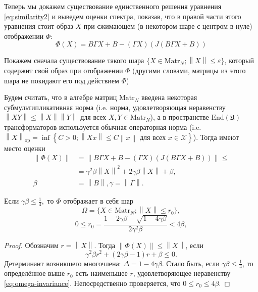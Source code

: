 Теперь мы докажем существование единственного решения уравнения \eqref{eq:similarity2}
и выведем оценки спектра,
показав, что в правой части этого уравнения стоит образ \( X \)
при сжимающем (в некотором шаре с центром в нуле) отображении \( \Phi \):
\[ \Phi(X) = B \Gamma X + B - (\Gamma X) (J(B\Gamma X + B)) \]

Покажем сначала существование такого шара \( \{ X\in\mathrm{Matr}_{N}; {\left\|X\right\|} \leq \varepsilon \} \),
который содержит свой образ при отображении \( \Phi \)
(другими словами, матрицы из этого шара
 не покидают его под действием \( \Phi \))

Будем считать, что в алгебре матриц \( \mathrm{Matr}_{N} \)
введена некоторая субмультипликативная норма
(i.e. норма, удовлетворяющая неравенству
 \( {\left\|XY\right\|}\leq {\left\|X\right\|}{\left\|Y\right\|} \) для всех \( X, Y \in\mathrm{Matr}_N\)),
а в пространстве \( \mathrm{End}\left({\mathfrak U}\right) \) трансформаторов
используется обычная операторная норма
(i.e. \( \left\|X\right\|_\mathrm{op} =
          \inf
          \left\{ C>0;
          {\left\|X x\right\|} \leq C {\left\|x\right\|} \text{ для всех } x\in\mathscr{X}
          \right\}
          \)).
Тогда имеют место оценки
\begin{align*}
    {\left\|\Phi(X)\right\|} &= {\left\|B \Gamma X + B - (\Gamma X) (J(B\Gamma X + B))\right\|} \leq \\
    &= \gamma^2\beta{\left\|X\right\|}^2 + 2\gamma\beta{\left\|X\right\|} + \beta, \\
    \beta&={\left\|B\right\|}, \gamma={\left\|\Gamma\right\|}.
\end{align*}
\begin{lemma}
    Если
    \( \gamma\beta \leq \frac14, \)
    то \( \Phi \) отображает в себя шар
    \begin{equation}\label{def:omega}
        \Omega = \{ X\in\mathrm{Matr}_{N} ; {\left\|X\right\|}\leq r_0 \},
    \end{equation}
    \[0 \leq r_0 = \frac{1 - 2\gamma\beta - \sqrt{1-4\gamma\beta}}{2\gamma^2\beta} < 4\beta, \]
\end{lemma}
\begin{proof}
    Обозначим \( r={\left\|X\right\|} \). Тогда
    \( {\left\|\Phi(X)\right\|} \leq {\left\|X\right\|} \), если
    \begin{equation}\label{eq:omega-invariance}
        \gamma^2\beta r^2 + (2\gamma\beta - 1) r + \beta \leq 0.
    \end{equation}
    Детерминант возникшего многочлена:
    \( \Delta = 1 - 4\gamma\beta\).\-
    Стало быть, если \( {\gamma\beta \leq \frac14} \),
    то определённое выше \( r_0 \) есть наименьшее \( r \),
    удовлетворяющее неравенству \eqref{eq:omega-invariance}.
    Непосредственно проверяется, что \( 0 \leq  r_0 \leq 4\beta \).
\end{proof}

